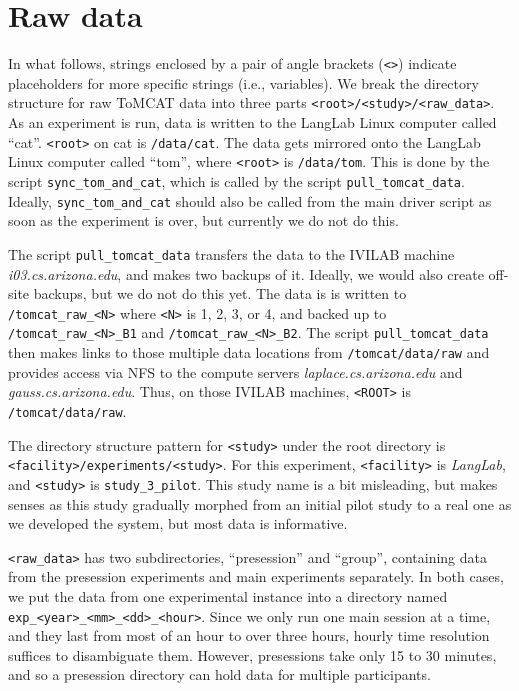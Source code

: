 \section{Raw data}

In what follows, strings enclosed by a pair of angle brackets (\verb|<>|) indicate
placeholders for more specific strings (i.e., variables).
We break the directory structure for raw ToMCAT data into three parts
\verb|<root>/<study>/<raw_data>|.
As an experiment is run, data is written to the LangLab Linux computer called
``cat''. \verb|<root>| on cat is
\verb|/data/cat|. The data gets mirrored onto the LangLab Linux computer called
``tom'', where \verb|<root>| is \verb|/data/tom|.
This is done by the script \verb|sync_tom_and_cat|, which is called by the script
\verb|pull_tomcat_data|. Ideally, \verb|sync_tom_and_cat| should also be
called from the main driver script as soon as the experiment is over, but
currently we do not do this.

The script \verb|pull_tomcat_data| transfers the data to the IVILAB machine
\textit{i03.cs.arizona.edu}, and makes two backups of it.  Ideally, we would
also create off-site backups, but we do not do this yet. The data is is
written to
\verb|/tomcat_raw_<N>| where \verb|<N>| is 1, 2, 3, or 4, and backed up to
\verb|/tomcat_raw_<N>_B1| and \verb|/tomcat_raw_<N>_B2|.
The script \verb|pull_tomcat_data| then makes links to those multiple data
locations from \verb|/tomcat/data/raw| and provides access via NFS to the compute
servers \textit{laplace.cs.arizona.edu} and \textit{gauss.cs.arizona.edu}.
Thus, on those IVILAB machines, \verb|<ROOT>| is \verb|/tomcat/data/raw|.

The directory structure pattern for \verb|<study>| under the root directory is
\verb|<facility>/experiments/<study>|. For this experiment, \verb|<facility>|
is \textit{LangLab}, and \verb|<study>| is \verb|study_3_pilot|.  This study
name is a bit misleading, but makes senses as this study gradually morphed from
an initial pilot study to a real one as we developed the system, but most data
is informative.

\verb|<raw_data>| has two subdirectories, ``presession'' and ``group'', containing data
from the presession experiments and main experiments separately. In both cases, we put the
data from one experimental instance into a directory named
\verb|exp_<year>_<mm>_<dd>_<hour>|. Since we only run one main session at a time, and
they last from most of an hour to over three hours, hourly time resolution
suffices to disambiguate them. However, presessions take only 15 to 30 minutes,
and so a presession directory can hold data for multiple participants.

